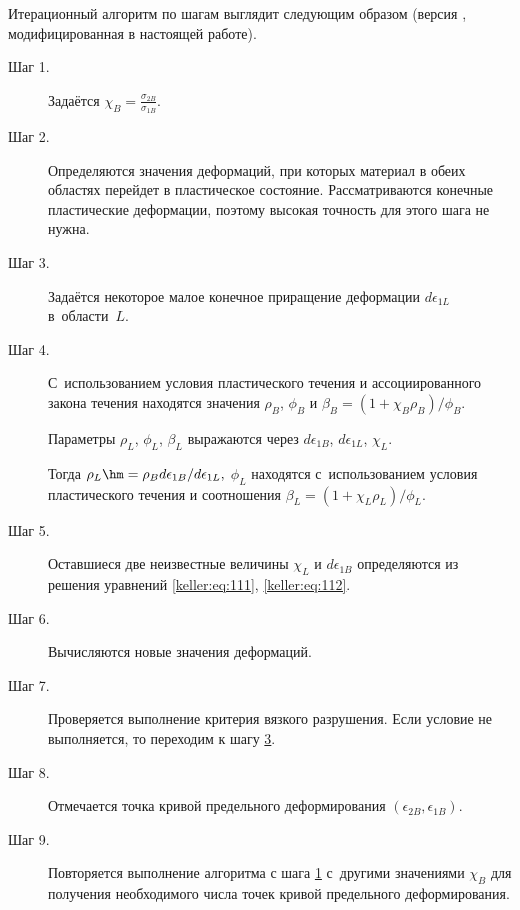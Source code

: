Итерационный алгоритм по шагам выглядит следующим образом (версия \cite{keller:bib:khan2011}, модифицированная в настоящей работе).



\smallskip

\begin{description}

\item[\small\sc Шаг 1.] \hypertarget{kel:step1}{} Задаётся $\chi_B = \frac{ \sigma_{2B}}{\sigma_{1B}}.$

\item[\small\sc Шаг 2.] \hypertarget{kel:step2}{} Определяются значения деформаций, при которых материал в обеих областях перейдет в пластическое состояние. Рассматриваются конечные пластические деформации, поэтому высокая точность для этого шага не нужна.

\item[\small\sc Шаг 3.]  \hypertarget{kel:step3}{}  Задаётся некоторое малое конечное приращение деформации $d\epsilon_{1L}$ в~области~$L.$ 

\item[\small\sc Шаг 4.] С~использованием условия пластического течения и ассоциированного закона течения находятся значения $\rho_B$, $\phi_B$ и $\beta_B = (1+\chi_B \rho_B)/\phi_B.$ 

Параметры $\rho_L$, $\phi_L$, $\beta_L$ выражаются через $d\epsilon_{1B}$, $d\epsilon_{1L}$, $\chi_L$. 

Тогда $\rho_L \hm = \rho_B d\epsilon_{1B}/d\epsilon_{1L},$ $\phi_L$ находятся с~использованием условия пластического течения и соотношения $\beta_L = (1+\chi_L \rho_L)/\phi_L.$

\item[\small\sc Шаг 5.] \hypertarget{kel:step5}{} Оставшиеся две неизвестные величины $\chi_L$ и $d\epsilon_{1B}$ определяются из решения уравнений \eqref{keller:eq:111}, \eqref{keller:eq:112}.

\item[\small\sc Шаг 6.] Вычисляются новые значения деформаций.

\item[\small\sc Шаг 7.] Проверяется выполнение критерия вязкого разрушения. Если условие не выполняется, то переходим к шагу \hyperlink{kel:step3}{3}.

\item[\small\sc Шаг 8.] Отмечается точка кривой предельного деформирования $(\epsilon_{2B},\epsilon_{1B}).$

\item[\small\sc Шаг 9.] Повторяется выполнение алгоритма с шага \hyperlink{kel:step1}{1} с~другими значениями $\chi_B$ для получения необходимого числа точек кривой предельного деформирования.

\end{description} 



